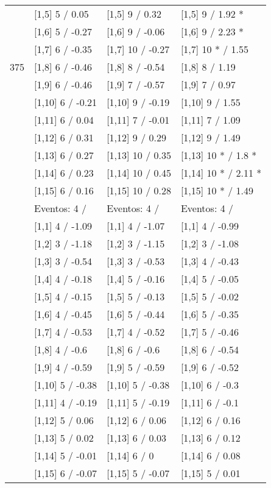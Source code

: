 \begin{table}
\begin{tabular}[t]{llll}
 & {}[1,5] 5  / 0.05 & {}[1,5] 9  / 0.32 & {}[1,5] 9  / 1.92 *\\
 & {}[1,6] 5  / -0.27 & {}[1,6] 9  / -0.06 & {}[1,6] 9  / 2.23 *\\
 & {}[1,7] 6  / -0.35 & {}[1,7] 10  / -0.27 & {}[1,7] 10 * / 1.55\\
375 & {}[1,8] 6  / -0.46 & {}[1,8] 8  / -0.54 & {}[1,8] 8  / 1.19\\
\addlinespace
 & {}[1,9] 6  / -0.46 & {}[1,9] 7  / -0.57 & {}[1,9] 7  / 0.97\\
 & {}[1,10] 6  / -0.21 & {}[1,10] 9  / -0.19 & {}[1,10] 9  / 1.55\\
 & {}[1,11] 6  / 0.04 & {}[1,11] 7  / -0.01 & {}[1,11] 7  / 1.09\\
 & {}[1,12] 6  / 0.31 & {}[1,12] 9  / 0.29 & {}[1,12] 9  / 1.49\\
 & {}[1,13] 6  / 0.27 & {}[1,13] 10  / 0.35 & {}[1,13] 10 * / 1.8 *\\
\addlinespace
 & {}[1,14] 6  / 0.23 & {}[1,14] 10  / 0.45 & {}[1,14] 10 * / 2.11 *\\
 & {}[1,15] 6  / 0.16 & {}[1,15] 10  / 0.28 & {}[1,15] 10 * / 1.49\\
 & Eventos:  4 / & Eventos:  4 / & Eventos:  4 /\\
 & {}[1,1] 4  / -1.09 & {}[1,1] 4  / -1.07 & {}[1,1] 4  / -0.99\\
 & {}[1,2] 3  / -1.18 & {}[1,2] 3  / -1.15 & {}[1,2] 3  / -1.08\\
\addlinespace
 & {}[1,3] 3  / -0.54 & {}[1,3] 3  / -0.53 & {}[1,3] 4  / -0.43\\
 & {}[1,4] 4  / -0.18 & {}[1,4] 5  / -0.16 & {}[1,4] 5  / -0.05\\
 & {}[1,5] 4  / -0.15 & {}[1,5] 5  / -0.13 & {}[1,5] 5  / -0.02\\
 & {}[1,6] 4  / -0.45 & {}[1,6] 5  / -0.44 & {}[1,6] 5  / -0.35\\
 & {}[1,7] 4  / -0.53 & {}[1,7] 4  / -0.52 & {}[1,7] 5  / -0.46\\
\addlinespace
500 & {}[1,8] 4  / -0.6 & {}[1,8] 6  / -0.6 & {}[1,8] 6  / -0.54\\
 & {}[1,9] 4  / -0.59 & {}[1,9] 5  / -0.59 & {}[1,9] 6  / -0.52\\
 & {}[1,10] 5  / -0.38 & {}[1,10] 5  / -0.38 & {}[1,10] 6  / -0.3\\
 & {}[1,11] 4  / -0.19 & {}[1,11] 5  / -0.19 & {}[1,11] 6  / -0.1\\
 & {}[1,12] 5  / 0.06 & {}[1,12] 6  / 0.06 & {}[1,12] 6  / 0.16\\
\addlinespace
 & {}[1,13] 5  / 0.02 & {}[1,13] 6  / 0.03 & {}[1,13] 6  / 0.12\\
 & {}[1,14] 5  / -0.01 & {}[1,14] 6  / 0 & {}[1,14] 6  / 0.08\\
 & {}[1,15] 6  / -0.07 & {}[1,15] 5  / -0.07 & {}[1,15] 5  / 0.01\\
\bottomrule
\end{tabular}
\end{table}
